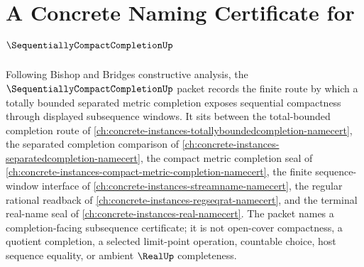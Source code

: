 \chapter{A Concrete Naming Certificate for $\SequentiallyCompactCompletionUp$}
\label{ch:concrete-instances-sequentially-compact-completion-namecert}

Following Bishop and Bridges constructive analysis, the $\SequentiallyCompactCompletionUp$ packet records the finite route by which a totally bounded separated metric completion exposes sequential compactness through displayed subsequence windows. It sits between the total-bounded completion route of \autoref{ch:concrete-instances-totallyboundedcompletion-namecert}, the separated completion comparison of \autoref{ch:concrete-instances-separatedcompletion-namecert}, the compact metric completion seal of \autoref{ch:concrete-instances-compact-metric-completion-namecert}, the finite sequence-window interface of \autoref{ch:concrete-instances-streamname-namecert}, the regular rational readback of \autoref{ch:concrete-instances-regseqrat-namecert}, and the terminal real-name seal of \autoref{ch:concrete-instances-real-namecert}. The packet names a completion-facing subsequence certificate; it is not open-cover compactness, a quotient completion, a selected limit-point operation, countable choice, host sequence equality, or ambient $\RealUp$ completeness.

